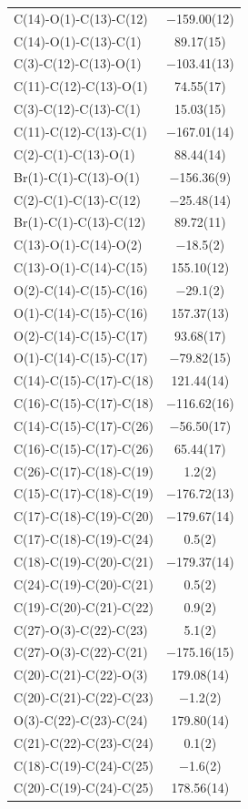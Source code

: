 \begin{center}
{\begin{supertabular}{p{1.5in}c}
C(14)-O(1)-C(13)-C(12)&$-$159.00(12)\\
C(14)-O(1)-C(13)-C(1)&89.17(15)\\
C(3)-C(12)-C(13)-O(1)&$-$103.41(13)\\
C(11)-C(12)-C(13)-O(1)&74.55(17)\\
C(3)-C(12)-C(13)-C(1)&15.03(15)\\
C(11)-C(12)-C(13)-C(1)&$-$167.01(14)\\
C(2)-C(1)-C(13)-O(1)&88.44(14)\\
Br(1)-C(1)-C(13)-O(1)&$-$156.36(9)\\
C(2)-C(1)-C(13)-C(12)&$-$25.48(14)\\
Br(1)-C(1)-C(13)-C(12)&89.72(11)\\
C(13)-O(1)-C(14)-O(2)&$-$18.5(2)\\
C(13)-O(1)-C(14)-C(15)&155.10(12)\\
O(2)-C(14)-C(15)-C(16)&$-$29.1(2)\\
O(1)-C(14)-C(15)-C(16)&157.37(13)\\
O(2)-C(14)-C(15)-C(17)&93.68(17)\\
O(1)-C(14)-C(15)-C(17)&$-$79.82(15)\\
C(14)-C(15)-C(17)-C(18)&121.44(14)\\
C(16)-C(15)-C(17)-C(18)&$-$116.62(16)\\
C(14)-C(15)-C(17)-C(26)&$-$56.50(17)\\
C(16)-C(15)-C(17)-C(26)&65.44(17)\\
C(26)-C(17)-C(18)-C(19)&1.2(2)\\
C(15)-C(17)-C(18)-C(19)&$-$176.72(13)\\
C(17)-C(18)-C(19)-C(20)&$-$179.67(14)\\
C(17)-C(18)-C(19)-C(24)&0.5(2)\\
C(18)-C(19)-C(20)-C(21)&$-$179.37(14)\\
C(24)-C(19)-C(20)-C(21)&0.5(2)\\
C(19)-C(20)-C(21)-C(22)&0.9(2)\\
C(27)-O(3)-C(22)-C(23)&5.1(2)\\
C(27)-O(3)-C(22)-C(21)&$-$175.16(15)\\
C(20)-C(21)-C(22)-O(3)&179.08(14)\\
C(20)-C(21)-C(22)-C(23)&$-$1.2(2)\\
O(3)-C(22)-C(23)-C(24)&179.80(14)\\
C(21)-C(22)-C(23)-C(24)&0.1(2)\\
C(18)-C(19)-C(24)-C(25)&$-$1.6(2)\\
C(20)-C(19)-C(24)-C(25)&178.56(14)\\

\end{supertabular}}
\end{center}
